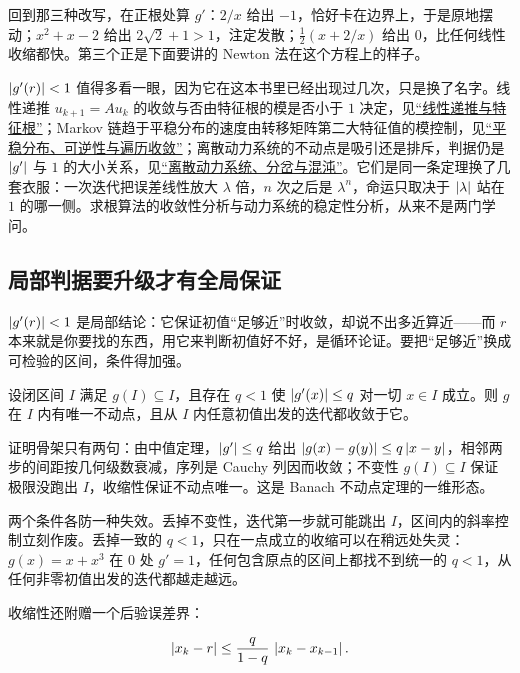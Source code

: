 回到那三种改写，在正根处算 \(g'\)：\(2/x\) 给出 \(-1\)，恰好卡在边界上，于是原地摆动；\(x^2+x-2\) 给出 \(2\sqrt2+1>1\)，注定发散；\(\frac12(x+2/x)\) 给出 \(0\)，比任何线性收缩都快。第三个正是下面要讲的 Newton 法在这个方程上的样子。

\(\left|g'(r)\right|<1\) 值得多看一眼，因为它在这本书里已经出现过几次，只是换了名字。线性递推 \(u_{k+1}=Au_k\) 的收敛与否由特征根的模是否小于 \(1\) 决定，见\hyperref[sec:04-Discrete-Mathematics/02-Recurrences/02]{``线性递推与特征根''}；Markov 链趋于平稳分布的速度由转移矩阵第二大特征值的模控制，见\hyperref[sec:06-Random-Processes/03-Markov-Chains/04]{``平稳分布、可逆性与遍历收敛''}；离散动力系统的不动点是吸引还是排斥，判据仍是 \(\left|g'\right|\) 与 \(1\) 的大小关系，见\hyperref[sec:15-Differential-Equations-and-Dynamical-Systems/02-Stability-and-Dynamical-Systems/03]{``离散动力系统、分岔与混沌''}。它们是同一条定理换了几套衣服：一次迭代把误差线性放大 \(\lambda\) 倍，\(n\) 次之后是 \(\lambda^n\)，命运只取决于 \(\left|\lambda\right|\) 站在 \(1\) 的哪一侧。求根算法的收敛性分析与动力系统的稳定性分析，从来不是两门学问。

\subsection{局部判据要升级才有全局保证}

\(\left|g'(r)\right|<1\) 是局部结论：它保证初值``足够近''时收敛，却说不出多近算近——而 \(r\) 本来就是你要找的东西，用它来判断初值好不好，是循环论证。要把``足够近''换成可检验的区间，条件得加强。

\begin{theorem}
设闭区间 \(I\) 满足 \(g(I)\subseteq I\)，且存在 \(q<1\) 使 \(\left|g'(x)\right|\le q\) 对一切 \(x\in I\) 成立。则 \(g\) 在 \(I\) 内有唯一不动点，且从 \(I\) 内任意初值出发的迭代都收敛于它。
\end{theorem}

证明骨架只有两句：由中值定理，\(\left|g'\right|\le q\) 给出 \(\left|g(x)-g(y)\right|\le q\left|x-y\right|\)，相邻两步的间距按几何级数衰减，序列是 Cauchy 列因而收敛；不变性 \(g(I)\subseteq I\) 保证极限没跑出 \(I\)，收缩性保证不动点唯一。这是 Banach 不动点定理的一维形态。

两个条件各防一种失效。丢掉不变性，迭代第一步就可能跳出 \(I\)，区间内的斜率控制立刻作废。丢掉一致的 \(q<1\)，只在一点成立的收缩可以在稍远处失灵：\(g(x)=x+x^3\) 在 \(0\) 处 \(g'=1\)，任何包含原点的区间上都找不到统一的 \(q<1\)，从任何非零初值出发的迭代都越走越远。

收缩性还附赠一个后验误差界：

\[
\left|x_k-r\right|\le\frac{q}{1-q}\,\left|x_k-x_{k-1}\right|.
\]

